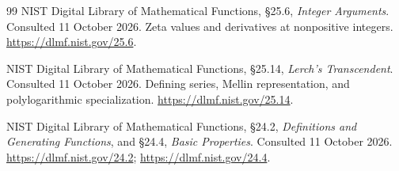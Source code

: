 \documentclass[11pt,letterpaper]{article}
\numberwithin{equation}{section}
\theoremstyle{definition}\newtheorem{definition}[theorem]{Definition}
\theoremstyle{remark}\newtheorem{remark}[theorem]{Remark}
\begin{document}
\begin{thebibliography}{99}
NIST Digital Library of Mathematical Functions, \S25.6,
\emph{Integer Arguments}. Consulted 11 October 2026.
Zeta values and derivatives at nonpositive integers.
\url{https://dlmf.nist.gov/25.6}.

NIST Digital Library of Mathematical Functions, \S25.14,
\emph{Lerch's Transcendent}. Consulted 11 October 2026.
Defining series, Mellin representation, and polylogarithmic specialization.
\url{https://dlmf.nist.gov/25.14}.

NIST Digital Library of Mathematical Functions, \S24.2,
\emph{Definitions and Generating Functions}, and \S24.4,
\emph{Basic Properties}. Consulted 11 October 2026.
\url{https://dlmf.nist.gov/24.2}; \url{https://dlmf.nist.gov/24.4}.
\end{thebibliography}

\end{document}
